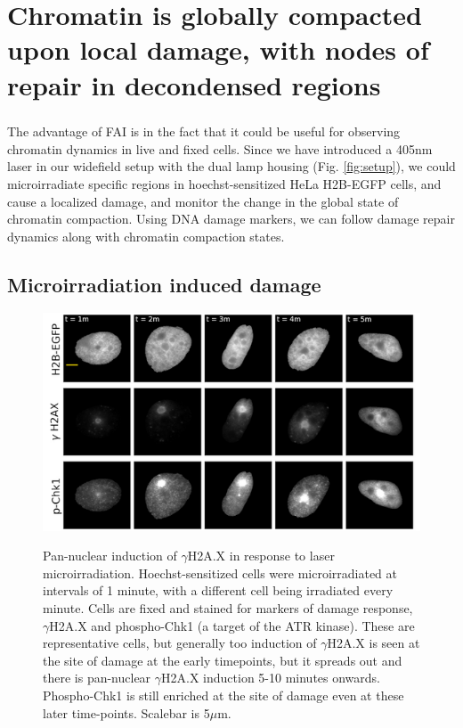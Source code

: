 \chapter{Chromatin is globally compacted upon local damage, with nodes of repair in decondensed regions}

\paragraph*{} The advantage of FAI is in the fact that it could be useful for observing chromatin dynamics in live and fixed cells. Since we have introduced a 405nm laser in our widefield setup with the dual lamp housing (Fig. {\ref{fig:setup}}), we could microirradiate specific regions in hoechst-sensitized HeLa H2B-EGFP cells, and cause a localized damage, and monitor the change in the global state of chromatin compaction. Using DNA damage markers, we can follow damage repair dynamics along with chromatin compaction states. 

\section{Microirradiation induced damage}

\begin{figure}[!htp]
    {\hfill\includegraphics[clip,width=1\linewidth]{figures/pchk1.png}\hspace*{\fill}}
    \caption{Pan-nuclear induction of $\gamma$H2A.X in response to laser microirradiation. Hoechst-sensitized cells were microirradiated at intervals of 1 minute, with a different cell being irradiated every minute. Cells are fixed and stained for markers of damage response, $\gamma$H2A.X and phospho-Chk1 (a target of the ATR kinase). These are representative cells, but generally too induction of $\gamma$H2A.X is seen at the site of damage at the early timepoints, but it spreads out and there is pan-nuclear $\gamma$H2A.X induction 5-10 minutes onwards. Phospho-Chk1 is still enriched at the site of damage even at these later time-points. Scalebar is 5$\mu$m.}
    {\label{fig:chk1}}
\end{figure}


